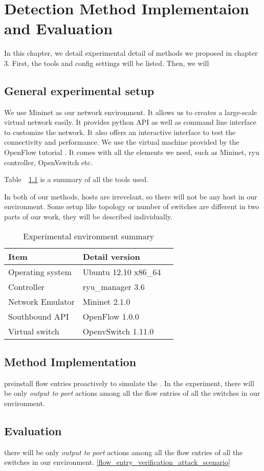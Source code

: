 \chapter{Detection Method Implementaion and Evaluation}
In this chapter, we detail experimental detail of methods we proposed in chapter 3. First, the tools and config settings will be listed. Then, we will 

\section{General experimental setup}
We use Mininet as our network environment. It allows us to creates a large-scale virtual network easily. 
It provides python API as well as command line interface to customize the network. It also offers an interactive interface to test the connectivity and performance. We use the virtual machine provided by the OpenFlow tutorial \cite{OFT}. It comes with all the elements we need, such as Mininet, ryu controller, OpenVswitch etc.

Table~~\ref{table:Experiment_table} is a summary of all the tools used. 

In both of our methods, hosts are irrevelant, so there will not be any host in our environment. Some setup like topology or number of switches are different in two parts of our work, they will be described individually.

\begin{table}[H]
\centering
\caption{Experimental environment summary}
\begin{tabular}{|l|p{4cm}|p{4.5cm}}
\hline Item & Detail version \\
\hline Operating system & Ubuntu 12.10 x86\_64 \\
\hline Controller & ryu\_manager 3.6 \\
\hline Network Emulator & Mininet 2.1.0\\
\hline Southbound API & OpenFlow 1.0.0 \\
\hline Virtual switch & OpenvSwitch 1.11.0 \\
\hline 
\end{tabular}
\label{table:Experiment_table}
\end{table}


\section{Method Implementation}
preinstall flow entries proactively to simulate the . 
In the experiment, there will be only \textit{output to port} actions among all the flow entries of all the switches in our environment. 
\subsection{}



\section{Evaluation}


there will be only \textit{output to port} actions among all the flow entries of all the switches in our environment. \ref{flow_entry_verification_attack_scenario} 